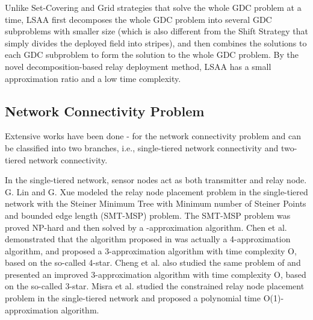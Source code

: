 \documentclass[journal]{IEEEtran}
\begin{document}
Unlike Set-Covering and Grid strategies that solve the whole GDC problem at a time, LSAA first decomposes the whole GDC problem into several GDC subproblems with smaller size (which is also different from the Shift Strategy that simply divides the deployed field into stripes), and then combines the solutions to each GDC subproblem to form the solution to the whole GDC problem. By the novel decomposition-based relay deployment method, LSAA has a small approximation ratio and a low time complexity.

\subsection{Network Connectivity Problem}
Extensive works have been done \cite{Tang06} \cite{Lin99}-\cite{Dandekar12} for the network connectivity problem and can be classified
into two branches, i.e., single-tiered network connectivity and two-tiered network connectivity.

In the single-tiered network, sensor nodes act as both transmitter and relay node. G. Lin and G. Xue \cite{Lin99} modeled the relay node placement
problem in the single-tiered network with the Steiner Minimum Tree with Minimum number of Steiner Points and bounded edge length (SMT-MSP) problem. The SMT-MSP problem was proved NP-hard and then solved by a -approximation algorithm. Chen et al. \cite{Chen00} demonstrated that the algorithm proposed in \cite{Lin99} was actually a 4-approximation algorithm, and proposed a 3-approximation algorithm with time complexity O, based on the so-called 4-star. Cheng et al. \cite{Cheng07} also studied the same problem of \cite{Chen00} and presented an improved 3-approximation algorithm with time complexity O, based on the so-called 3-star. Misra et al. \cite{Misra08} \cite{Misra10} studied the constrained relay node placement problem in the single-tiered network and proposed a polynomial time O(1)-approximation algorithm.
\end{document}
